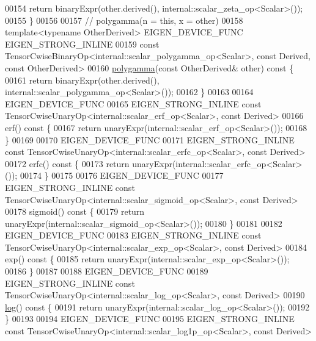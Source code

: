 \begin{DoxyCode}
00154       \textcolor{keywordflow}{return} binaryExpr(other.derived(), internal::scalar\_zeta\_op<Scalar>());
00155     \}
00156 
00157     \textcolor{comment}{// polygamma(n = this, x = other)}
00158     \textcolor{keyword}{template}<\textcolor{keyword}{typename} OtherDerived> EIGEN\_DEVICE\_FUNC EIGEN\_STRONG\_INLINE
00159     \textcolor{keyword}{const} TensorCwiseBinaryOp<internal::scalar\_polygamma\_op<Scalar>, \textcolor{keyword}{const} Derived, \textcolor{keyword}{const} OtherDerived>
00160     \hyperlink{namespace_eigen_ae3b47a13a0699f5dbaa0623c11333dca}{polygamma}(\textcolor{keyword}{const} OtherDerived& other)\textcolor{keyword}{ const }\{
00161       \textcolor{keywordflow}{return} binaryExpr(other.derived(), internal::scalar\_polygamma\_op<Scalar>());
00162     \}
00163 
00164     EIGEN\_DEVICE\_FUNC
00165     EIGEN\_STRONG\_INLINE \textcolor{keyword}{const} TensorCwiseUnaryOp<internal::scalar\_erf\_op<Scalar>, \textcolor{keyword}{const} Derived>
00166     erf()\textcolor{keyword}{ const }\{
00167       \textcolor{keywordflow}{return} unaryExpr(internal::scalar\_erf\_op<Scalar>());
00168     \}
00169 
00170     EIGEN\_DEVICE\_FUNC
00171     EIGEN\_STRONG\_INLINE \textcolor{keyword}{const} TensorCwiseUnaryOp<internal::scalar\_erfc\_op<Scalar>, \textcolor{keyword}{const} Derived>
00172     erfc()\textcolor{keyword}{ const }\{
00173       \textcolor{keywordflow}{return} unaryExpr(internal::scalar\_erfc\_op<Scalar>());
00174     \}
00175 
00176     EIGEN\_DEVICE\_FUNC
00177     EIGEN\_STRONG\_INLINE \textcolor{keyword}{const} TensorCwiseUnaryOp<internal::scalar\_sigmoid\_op<Scalar>, \textcolor{keyword}{const} Derived>
00178     sigmoid()\textcolor{keyword}{ const }\{
00179       \textcolor{keywordflow}{return} unaryExpr(internal::scalar\_sigmoid\_op<Scalar>());
00180     \}
00181 
00182     EIGEN\_DEVICE\_FUNC
00183     EIGEN\_STRONG\_INLINE \textcolor{keyword}{const} TensorCwiseUnaryOp<internal::scalar\_exp\_op<Scalar>, \textcolor{keyword}{const} Derived>
00184     exp()\textcolor{keyword}{ const }\{
00185       \textcolor{keywordflow}{return} unaryExpr(internal::scalar\_exp\_op<Scalar>());
00186     \}
00187 
00188     EIGEN\_DEVICE\_FUNC
00189     EIGEN\_STRONG\_INLINE \textcolor{keyword}{const} TensorCwiseUnaryOp<internal::scalar\_log\_op<Scalar>, \textcolor{keyword}{const} Derived>
00190     \hyperlink{structlog}{log}()\textcolor{keyword}{ const }\{
00191       \textcolor{keywordflow}{return} unaryExpr(internal::scalar\_log\_op<Scalar>());
00192     \}
00193 
00194     EIGEN\_DEVICE\_FUNC
00195     EIGEN\_STRONG\_INLINE \textcolor{keyword}{const} TensorCwiseUnaryOp<internal::scalar\_log1p\_op<Scalar>, \textcolor{keyword}{const} Derived>

\end{DoxyCode}
